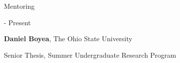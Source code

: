 \documentclass[cv.tex]{subfiles}
\begin{document}
\par\null\par\noindent
{\color{themecolor} \large Mentoring}
\par\noindent
\parbox{0.18\textwidth}{%
	 - Present \par
	\null
}
\hspace{1mm}
\parbox{0.8\textwidth}{%
	\vspace{1mm}
	\textbf{Daniel Boyea}, The Ohio State University \par
	Senior Thesis, Summer Undergraduate Research Program
}
\end{document}
